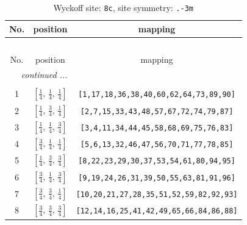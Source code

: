 \documentclass[fleqn,8pt]{jsarticle}
\begin{document}
\begin{longtable}{ccc}
\caption{Wyckoff site: {\tt 8c}, site symmetry: {\tt .-3m}}
 \\
 \hline \hline
No. & position & mapping \\ \hline \endfirsthead

\multicolumn{2}{l}{\tablename\ \thetable{}} \\
 \hline \hline
No. & position & mapping \\ \hline \endhead

 \hline \hline
\multicolumn{2}{r}{\footnotesize\it continued ...} \\ \endfoot

 \hline \hline
\multicolumn{2}{r}{} \\ \endlastfoot

1 & $\left[ \frac{1}{4},\, \frac{1}{4},\, \frac{1}{4} \right]$ & {\tt [1,17,18,36,38,40,60,62,64,73,89,90]} \\ \hline
2 & $\left[ \frac{1}{4},\, \frac{3}{4},\, \frac{1}{4} \right]$ & {\tt [2,7,15,33,43,48,57,67,72,74,79,87]} \\ \hline
3 & $\left[ \frac{1}{4},\, \frac{1}{4},\, \frac{3}{4} \right]$ & {\tt [3,4,11,34,44,45,58,68,69,75,76,83]} \\ \hline
4 & $\left[ \frac{3}{4},\, \frac{1}{4},\, \frac{1}{4} \right]$ & {\tt [5,6,13,32,46,47,56,70,71,77,78,85]} \\ \hline
5 & $\left[ \frac{1}{4},\, \frac{3}{4},\, \frac{3}{4} \right]$ & {\tt [8,22,23,29,30,37,53,54,61,80,94,95]} \\ \hline
6 & $\left[ \frac{3}{4},\, \frac{1}{4},\, \frac{3}{4} \right]$ & {\tt [9,19,24,26,31,39,50,55,63,81,91,96]} \\ \hline
7 & $\left[ \frac{3}{4},\, \frac{3}{4},\, \frac{1}{4} \right]$ & {\tt [10,20,21,27,28,35,51,52,59,82,92,93]} \\ \hline
8 & $\left[ \frac{3}{4},\, \frac{3}{4},\, \frac{3}{4} \right]$ & {\tt [12,14,16,25,41,42,49,65,66,84,86,88]} \\
\end{longtable}
\renewcommand{\arraystretch}{1.2}
\end{document}
